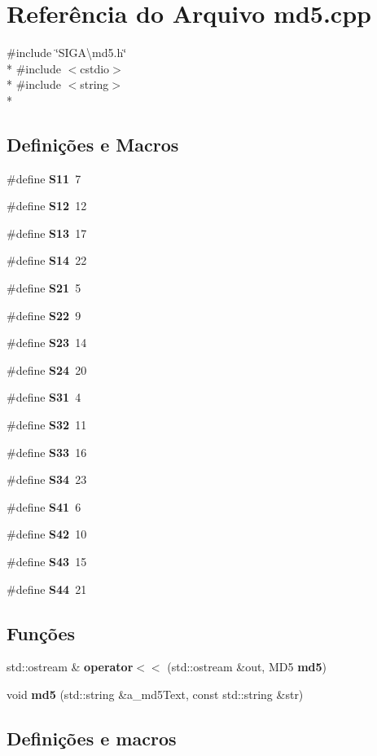 \section{Referência do Arquivo md5.\+cpp}
\label{md5_8cpp}
{\ttfamily \#include \char`\"{}S\+I\+G\+A\textbackslash{}md5.\+h\char`\"{}}\\*
{\ttfamily \#include $<$cstdio$>$}\\*
{\ttfamily \#include $<$string$>$}\\*
\subsection*{Definições e Macros}
\begin{DoxyCompactItemize}
\item 
\#define {\bf S11}~7
\item 
\#define {\bf S12}~12
\item 
\#define {\bf S13}~17
\item 
\#define {\bf S14}~22
\item 
\#define {\bf S21}~5
\item 
\#define {\bf S22}~9
\item 
\#define {\bf S23}~14
\item 
\#define {\bf S24}~20
\item 
\#define {\bf S31}~4
\item 
\#define {\bf S32}~11
\item 
\#define {\bf S33}~16
\item 
\#define {\bf S34}~23
\item 
\#define {\bf S41}~6
\item 
\#define {\bf S42}~10
\item 
\#define {\bf S43}~15
\item 
\#define {\bf S44}~21
\end{DoxyCompactItemize}
\subsection*{Funções}
\begin{DoxyCompactItemize}
\item 
std\+::ostream \& {\bf operator$<$$<$} (std\+::ostream \&out, M\+D5 {\bf md5})
\item 
void {\bf md5} (std\+::string \&a\+\_\+md5\+Text, const std\+::string \&str)
\end{DoxyCompactItemize}


\subsection{Definições e macros}

